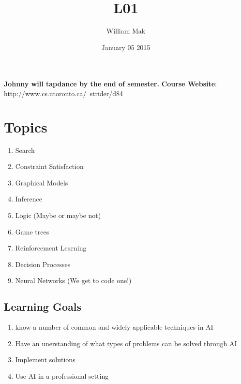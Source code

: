 \documentclass{article}
\title{L01}
\author{William Mak}
\date{January 05 2015}
\begin{document}
\maketitle
\textbf{Johnny will tapdance by the end of semester.}
\textbf{Course Website}: http://www.cs.utoronto.ca/~strider/d84
\section{Topics}
\begin{enumerate}
	\item Search
	\item Constraint Satisfaction
	\item Graphical Models
	\item Inference
	\item Logic (Maybe or maybe not)
	\item Game trees
	\item Reinforcement Learning
	\item Decision Processes
	\item Neural Networks (We get to code one!)
\end{enumerate}
\subsection{Learning Goals}
\begin{enumerate}
	\item know a number of common and widely applicable techniques in AI
	\item Have an unerstanding of what types of problems can be solved through
		AI
	\item Implement solutions
	\item Use AI in a professional setting
\end{enumerate}
\end{document}
